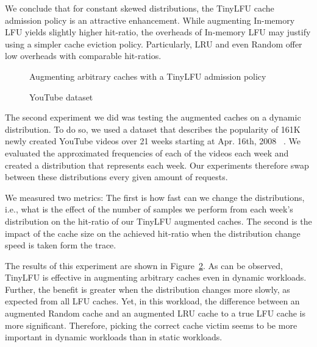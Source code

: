 \documentclass[10pt,a4paper]{article}
\begin{document}
We conclude that for constant skewed distributions, the TinyLFU cache admission policy is an attractive enhancement.
While augmenting In-memory LFU yields slightly higher hit-ratio, the overheads of In-memory LFU may justify using a simpler cache eviction policy.
Particularly, LRU and even Random offer low overheads with comparable hit-ratios.



\begin{figure}[t]
\caption{Augmenting arbitrary caches with a TinyLFU admission policy}
\label{fig:PerformanceFilter}
\end{figure}

\begin{figure}[t]
\caption{YouTube dataset}
\label{fig:YouTube}
\end{figure}

The second experiment we did was testing the augmented caches on a dynamic distribution. To do so, we used a dataset that describes the
 popularity of 161K newly created YouTube videos over 21 weeks starting at Apr. 16th, 2008 ~\cite{YouTubeDataSet}.
We evaluated the approximated frequencies of each of the videos each week and created a distribution that represents each week.
Our experiments therefore swap between these distributions every given amount of requests.

We measured two metrics: The first is how fast can we change the distributions, i.e., what is the effect of the number of samples we perform from each week's distribution
on the hit-ratio of our TinyLFU augmented caches.
The second is the impact of the cache size on the achieved hit-ratio when the distribution change speed is taken form the trace.

The results of this experiment are shown in Figure~\ref{fig:YouTube}. As can be observed, TinyLFU is effective in augmenting arbitrary caches even in dynamic workloads.
Further, the benefit is greater when the distribution changes more slowly, as expected from all LFU caches. Yet, in this workload, the difference
between an augmented Random cache and an augmented LRU cache to a true LFU cache is more significant.
Therefore, picking the correct cache victim seems to be more important in dynamic workloads than in static workloads.
\end{document}
